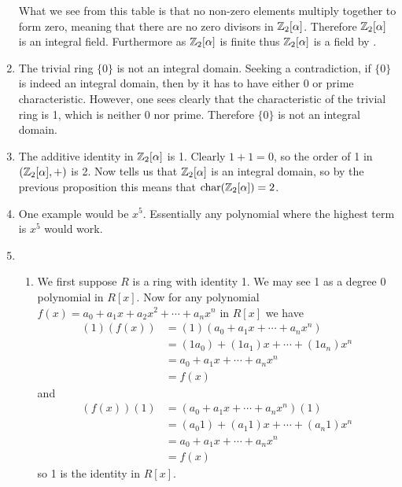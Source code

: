 \begin{enumerate}
    What we see from this table is that no non-zero elements multiply together to form zero, meaning that there are no zero divisors in $\mathbb{Z}_{2}[\alpha]$. Therefore $\mathbb{Z}_{2}[\alpha]$ is an integral field. Furthermore as $\mathbb{Z}_{2}[\alpha]$ is finite thus $\mathbb{Z}_{2}[\alpha]$ is a field by .

    \item The trivial ring $\{0\}$ is not an integral domain. Seeking a contradiction, if $\{0\}$ is indeed an integral domain, then by it has to have either 0 or prime characteristic. However, one sees clearly that the characteristic of the trivial ring is 1, which is neither 0 nor prime. Therefore $\{0\}$ is not an integral domain.

    \item The additive identity in $\mathbb{Z}_{2}[\alpha]$ is 1. Clearly $1 + 1 = 0$, so the order of 1 in $(\mathbb{Z}_{2}[\alpha],+)$ is 2. Now  tells us that $\mathbb{Z}_{2}[\alpha]$ is an integral domain, so by the previous proposition this means that $\mathrm{char}(\mathbb{Z}_{2}[\alpha]) = 2$.
    
    \item One example would be $x^5$. Essentially any polynomial where the highest term is $x^5$ would work.
    
    \item \begin{enumerate}[label=(\alph*)]
        \item We first suppose $R$ is a ring with identity 1. We may see 1 as a degree 0 polynomial in $R[x]$. Now for any polynomial $f(x) = a_0+a_1x+a_2x^2+\cdots+a_nx^n$ in $R[x]$ we have
        \begin{align*}
            (1)(f(x)) &= (1)(a_0+a_1x+\cdots+a_nx^n)\\
            &= (1a_0)+(1a_1)x+\cdots+(1a_n)x^n\\
            &= a_0+a_1x+\cdots+a_nx^n\\
            &= f(x)
        \end{align*}
        and
        \begin{align*}
            (f(x))(1) &= (a_0+a_1x+\cdots+a_nx^n)(1)\\
            &= (a_{0}1)+(a_{1}1)x+\cdots+(a_{n}1)x^n\\
            &= a_0+a_1x+\cdots+a_nx^n\\
            &= f(x)
        \end{align*}
        so 1 is the identity in $R[x]$.


\end{enumerate}
\end{enumerate}
